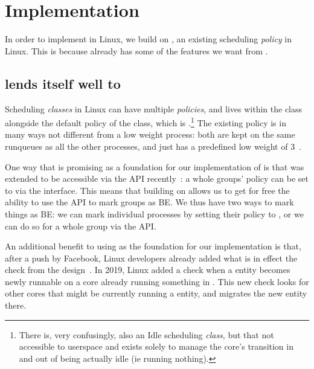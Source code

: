 \section{Implementation}\label{s:implementation}


In order to implement \beclass{} in Linux, we build on \schedidle{}, an existing
scheduling \textit{policy} in Linux. This is because \schedidle{} already has
some of the features we want from \beclass{}.

\subsection{\schedidle{} lends itself well to \beclass{}}

Scheduling \textit{classes} in Linux can have multiple \textit{policies}, and
\schedidle{} lives within the \normalclass{} class alongside the default policy
of the \normalclass{} class, which is \schednormal{}.\footnote{There is, very
confusingly, also an Idle scheduling \textit{class}, but that not accessible to
userspace and exists solely to manage the core's transition in and out of being
actually idle (ie running nothing).} The existing \schedidle{} policy is in many
ways not different from a low weight \schednormal{} process: both are kept on
the same runqueues as all the other \schednormal{} processes, and \schedidle{}
just has a predefined low weight of 3~\cite{weight-idleprio}.

One way that \schedidle{} is promising as a foundation for our implementation of
\beclass{} is that \schedidle{} was extended to be accessible via the \cgroups{}
API recently~\cite{lkml-idle-cgroup}: a whole groups' policy can be set to
\schedidle{} via the \cgroups{} interface. This means that building on
\schedidle{} allows us to get for free the ability to use the \cgroups{} API to
mark groups as BE. We thus have two ways to mark things as BE: we can mark
individual processes by setting their policy to \schedidle{}, or we can do so
for a whole group via the \cgroups{} API.

An additional benefit to using \schedidle{} as the foundation for our
implementation is that, after a push by Facebook, Linux developers already added
what is in effect the \entry{} check from the \beclass{}
design~\cite{fixing-idle-article}. In 2019, Linux added a check when a
\schednormal{} entity becomes newly runnable on a core already running something
in \schednormal{}. This new check looks for other cores that might be currently
running a \schedidle{} entity, and migrates the new entity there.

